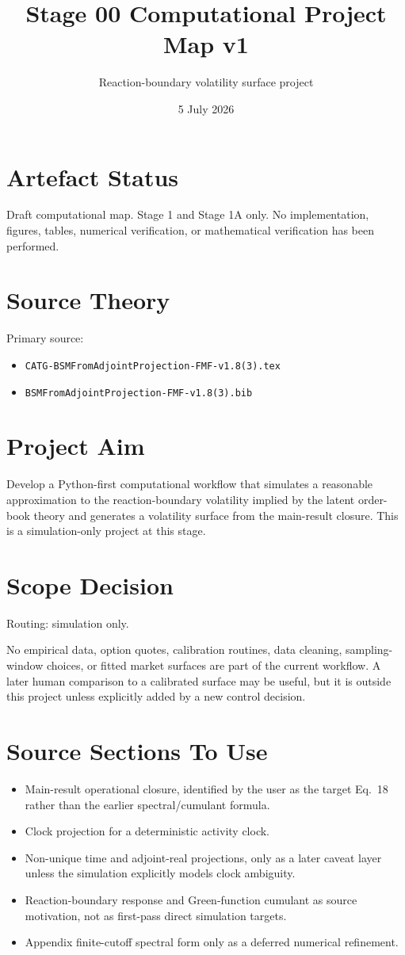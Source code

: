 \documentclass[11pt]{article}
\title{Stage 00 Computational Project Map v1}
\author{Reaction-boundary volatility surface project}
\date{5 July 2026}
\begin{document}
\maketitle

\section*{Artefact Status}
Draft computational map. Stage 1 and Stage 1A only. No implementation,
figures, tables, numerical verification, or mathematical verification has
been performed.

\section*{Source Theory}
Primary source:
\begin{itemize}
  \item \texttt{CATG-BSMFromAdjointProjection-FMF-v1.8(3).tex}
  \item \texttt{BSMFromAdjointProjection-FMF-v1.8(3).bib}
\end{itemize}

\section*{Project Aim}
Develop a Python-first computational workflow that simulates a reasonable
approximation to the reaction-boundary volatility implied by the latent
order-book theory and generates a volatility surface from the main-result
closure. This is a simulation-only project at this stage.

\section*{Scope Decision}
Routing: simulation only.

No empirical data, option quotes, calibration routines, data cleaning,
sampling-window choices, or fitted market surfaces are part of the current
workflow. A later human comparison to a calibrated surface may be useful,
but it is outside this project unless explicitly added by a new control
decision.

\section*{Source Sections To Use}
\begin{itemize}
  \item Main-result operational closure, identified by the user as the
  target Eq.~18 rather than the earlier spectral/cumulant formula.
  \item Clock projection for a deterministic activity clock.
  \item Non-unique time and adjoint-real projections, only as a later
  caveat layer unless the simulation explicitly models clock ambiguity.
  \item Reaction-boundary response and Green-function cumulant as source
  motivation, not as first-pass direct simulation targets.
  \item Appendix finite-cutoff spectral form only as a deferred numerical
  refinement.
\end{itemize}
\end{document}
